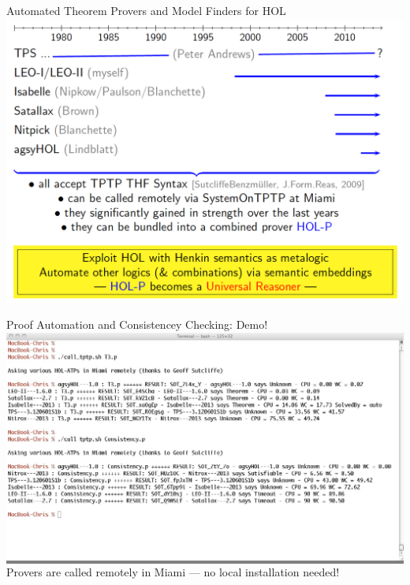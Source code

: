 \begin{frame}{Automated Theorem Provers and Model Finders for HOL}
\includegraphics[width=1.05\textwidth]{HOLProversGrab}
\end{frame}


\begin{frame}{Proof Automation and Consistencey Checking: Demo!} \large
\colorbox{gray}{\includegraphics[width=\textwidth]{DemoGrap}} 
\vfill 
Provers are called remotely in Miami --- no local installation needed!
\end{frame}
